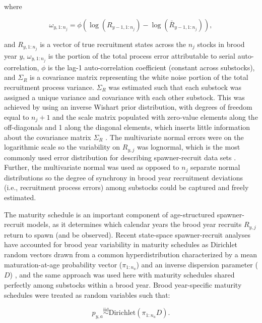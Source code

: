 \documentclass[12pt,]{book}
\theoremstyle{definition}
\theoremstyle{definition}
\theoremstyle{definition}
\theoremstyle{remark}
\begin{document}
\noindent
where

\begin{equation}
  \omega_{y,1:n_j} = \phi \left(\log(R_{y-1,1:n_j}) - \log(\bar{R}_{y-1,1:n_j}) \right),
  \label{eq:tsm-omega}
\end{equation}

\noindent
and \(R_{y,1:n_j}\) is a vector of true recruitment states across the
\(n_j\) stocks in brood year \(y\), \(\omega_{y,1:n_j}\) is the portion
of the total process error attributable to serial auto-correlation,
\(\phi\) is the lag-1 auto-correlation coefficient (constant across
substocks), and \(\Sigma_R\) is a covariance matrix representing the
white noise portion of the total recruitment process variance.
\(\Sigma_R\) was estimated such that each substock was assigned a unique
variance and covariance with each other substock. This was achieved by
using an inverse Wishart prior distribution, with degrees of freedom
equal to \(n_j + 1\) and the scale matrix populated with zero-value
elements along the off-diagonals and 1 along the diagonal elements,
which inserts little information about the covariance matrix
\(\Sigma_R\) \citep{plummer-2017}. The multivariate normal errors were
on the logarithmic scale so the variability on \(R_{y,j}\) was
lognormal, which is the most commonly used error distribution for
describing spawner-recruit data sets \citep{walters-martell-2004}.
Further, the multivariate normal was used as opposed to \(n_j\) separate
normal distributions so the degree of synchrony in brood year
recruitment deviations (i.e., recruitment process errors) among
substocks could be captured and freely estimated.

The maturity schedule is an important component of age-structured
spawner-recruit models, as it determines which calendar years the brood
year recruits \(R_{y,j}\) return to spawn (and be observed). Recent
state-space spawner-recruit analyses have accounted for brood year
variability in maturity schedules as Dirichlet random vectors drawn from
a common hyperdistribution characterized by a mean maturation-at-age
probability vector (\(\pi_{1:n_a}\)) and an inverse dispersion parameter
(\(D\)) \citep[see][ for implementation in
JAGS]{fleischman-etal-2013, staton-etal-2017-intseq}, and the same
approach was used here with maturity schedules shared perfectly among
substocks within a brood year. Brood year-specific maturity schedules
were treated as random variables such that:

\begin{equation}
  p_{y,a} \stackrel{\text{iid}}{\sim} \text{Dirichlet}(\pi_{1:n_a} D). 
  \label{eq:dirichlet}
\end{equation}
\end{document}
